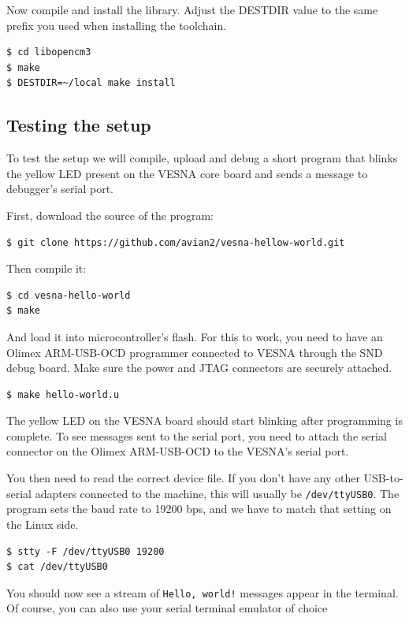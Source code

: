 \documentclass[a4paper, 10pt]{article}
\begin{document}
Now compile and install the library. Adjust the DESTDIR value to the same prefix
you used when installing the toolchain.

\begin{verbatim}
$ cd libopencm3
$ make
$ DESTDIR=~/local make install
\end{verbatim}

\subsection{Testing the setup}

To test the setup we will compile, upload and debug a short program that blinks
the yellow LED present on the VESNA core board and sends a message to debugger's
serial port.

First, download the source of the program:

\begin{verbatim}
$ git clone https://github.com/avian2/vesna-hellow-world.git
\end{verbatim}

Then compile it:

\begin{verbatim}
$ cd vesna-hello-world
$ make
\end{verbatim}

And load it into microcontroller's flash. For this to work, you need to have an
Olimex ARM-USB-OCD programmer connected to VESNA through the SND debug board.
Make sure the power and JTAG connectors are securely attached.

\begin{verbatim}
$ make hello-world.u
\end{verbatim}

The yellow LED on the VESNA board should start blinking after programming is complete.
To see messages sent to the serial port, you need to attach the serial
connector on the Olimex ARM-USB-OCD to the VESNA's serial port. 

You then need to read the correct device file. If you don't have any
other USB-to-serial adapters connected to the machine, this will usually be
\verb|/dev/ttyUSB0|. The program sets the baud rate to 19200 bps, and we have to
match that setting on the Linux side.

\begin{verbatim}
$ stty -F /dev/ttyUSB0 19200
$ cat /dev/ttyUSB0
\end{verbatim}

You should now see a stream of \verb|Hello, world!| messages appear in the
terminal. Of course, you can also use your serial terminal emulator of choice 
\end{document}
